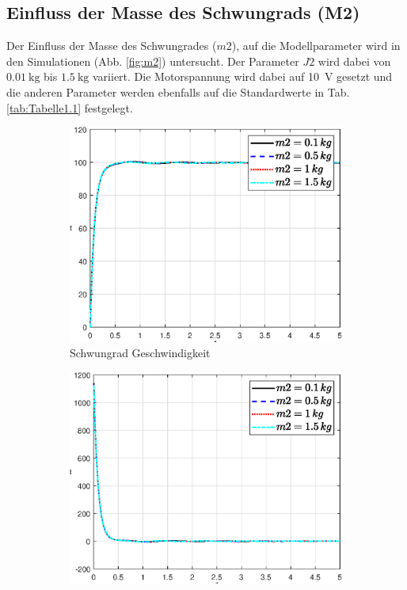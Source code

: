  \subsection*{Einfluss der Masse des Schwungrads (M2)}
 Der Einfluss der Masse des Schwungrades ($m2$), auf die Modellparameter wird in den Simulationen (Abb. \ref{fig:m2}) untersucht. 
 Der Parameter $J2$ wird dabei von $\SI{0.01}{\kg}$ bis $\SI{1.5}{\kg}$ variiert.
 Die Motorspannung wird dabei auf \SI{10}{\volt} gesetzt und die anderen Parameter werden ebenfalls auf die Standardwerte in Tab. \ref{tab:Tabelle1.1} festgelegt.\\
 \begin{figure}
    \captionsetup[subfigure]{justification=centering,font=footnotesize}
    \begin{subfigure}[b]{0.49\linewidth}
        \includegraphics[width=\linewidth]{Bilder/5_sensi/fig/m2/phi_punkt.eps}
        \caption{Schwungrad Geschwindigkeit}
        \label{fig:m2_phi_punkt}
    \end{subfigure}
    \begin{subfigure}[b]{0.49 \linewidth}
        \includegraphics[width=\linewidth]{Bilder/5_sensi/fig/m2/phi_punkt_punkt.eps}

\end{subfigure}
\end{figure}
